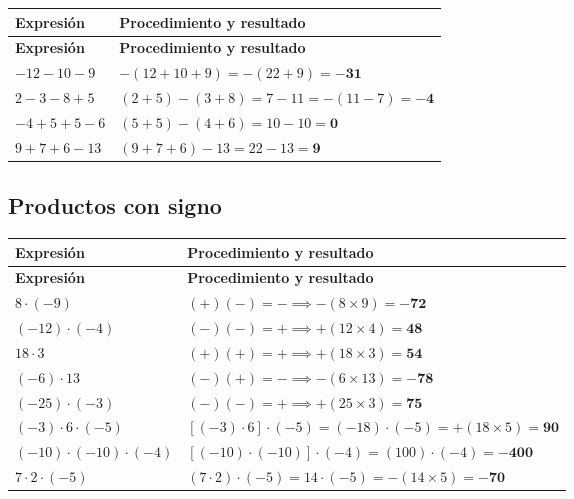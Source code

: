\documentclass[spanish,letterpaper,oneside]{article}
\begin{document}
{\small{}\renewcommand{\arraystretch}{1.28}
\begin{longtable}{|>{\raggedright\arraybackslash}p{}|>{\raggedright\arraybackslash}p{}|}\hline
\rowcolor{iiiepePale} \textbf{Expresión} & \textbf{Procedimiento y resultado} \\\hline
\endfirsthead
\hline
\rowcolor{iiiepePale} \textbf{Expresión} & \textbf{Procedimiento y resultado} \\\hline
\endhead
$-12-10-9$ & $-(12+10+9) = -(22+9) = \mathbf{-31}$ \\\hline
$2-3-8+5$ & $(2+5)-(3+8) = 7-11 = -(11-7) = \mathbf{-4}$ \\\hline
$-4+5+5-6$ & $(5+5)-(4+6) = 10-10 = \mathbf{0}$ \\\hline
$9+7+6-13$ & $(9+7+6)-13 = 22-13 = \mathbf{9}$ \\\hline
\end{longtable}}

\subsection*{Productos con signo}


{\small{}\renewcommand{\arraystretch}{1.28}
\begin{longtable}{|>{\raggedright\arraybackslash}p{}|>{\raggedright\arraybackslash}p{}|}\hline
\rowcolor{iiiepePale} \textbf{Expresión} & \textbf{Procedimiento y resultado} \\\hline
\endfirsthead
\hline
\rowcolor{iiiepePale} \textbf{Expresión} & \textbf{Procedimiento y resultado} \\\hline
\endhead
$8\cdot(-9)$ & $(+)(-)=- \implies -(8\times 9) = \mathbf{-72}$ \\\hline
$(-12)\cdot(-4)$ & $(-)(-)=+ \implies +(12\times 4) = \mathbf{48}$ \\\hline
$18\cdot3$ & $(+)(+)=+ \implies +(18\times 3) = \mathbf{54}$ \\\hline
$(-6)\cdot13$ & $(-)(+)=- \implies -(6\times 13) = \mathbf{-78}$ \\\hline
$(-25)\cdot(-3)$ & $(-)(-)=+ \implies +(25\times 3) = \mathbf{75}$ \\\hline
$(-3)\cdot6\cdot(-5)$ & $[(-3)\cdot 6]\cdot(-5) = (-18)\cdot(-5) = +(18\times 5) = \mathbf{90}$ \\\hline
$(-10)\cdot(-10)\cdot(-4)$ & $[(-10)\cdot(-10)]\cdot(-4) = (100)\cdot(-4) = \mathbf{-400}$ \\\hline
$7\cdot2\cdot(-5)$ & $(7\cdot 2)\cdot(-5) = 14\cdot(-5) = -(14\times 5) = \mathbf{-70}$ \\\hline
\end{longtable}}
\end{document}

